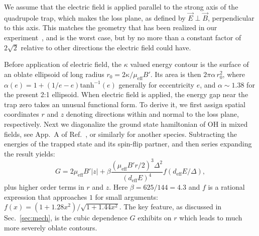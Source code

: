 We assume that the electric field is applied parallel to the strong axis of the quadrupole trap, which makes the loss plane, as defined by $\vec{E}\perp\vec{B}$, perpendicular to this axis. This matches the geometry that has been realized in our experiment~\cite{Stuhl2013}, and is the worst case, but by no more than a constant factor of $2\sqrt{2}$ relative to other directions the electric field could have.

Before application of electric field, the $\kappa$ valued energy contour is the surface of an oblate ellipsoid of long radius $r_0=2\kappa/\mu_\text{eff}B'$.
Its area is then $2\pi\alpha\,r_0^2$, where $\alpha(e)=1+(1/e-e)\text{tanh}^{-1}(e)$ generally for eccentricity $e$, and $\alpha\sim 1.38$ for the present 2:1 ellipsoid.
When electric field is applied, the energy gap near the trap zero takes an unusual functional form.
To derive it, we first assign spatial coordinates $r$ and $z$ denoting directions within and normal to the loss plane, respectively.
Next we diagonalize the ground state hamiltonian of OH in mixed fields, see App.~A of Ref.~\cite{Stuhl2012uwave}, or similarly for another species.
Subtracting the energies of the trapped state and its spin-flip partner, and then series expanding the result yields:
\begin{equation}
\label{eqn:energy}
G = 2\mu_\text{eff}B'|z| + \beta\frac{(\mu_\text{eff}B'r/2)^3\Delta^2}{(d_\text{eff}E)^4}f(d_\text{eff}E/\Delta),
\end{equation}
plus higher order terms in $r$ and $z$.
Here $\beta=625/144=4.3$ and $f$ is a rational expression that approaches $1$ for small arguments: $f(x) = (1 + 1.28x^2)/\sqrt{1+1.44x^2}$.
The key feature, as discussed in Sec.~\ref{sec:mech}, is the cubic dependence $G$ exhibits on $r$ which leads to much more severely oblate contours.

